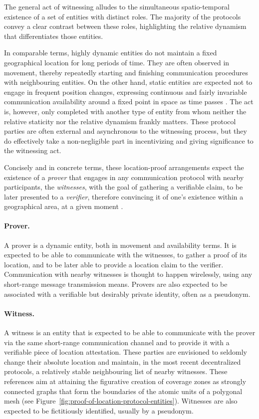 The general act of witnessing alludes to the simultaneous spatio-temporal existence of a set of entities with distinct roles. The majority of the protocols convey a clear contrast between these roles, highlighting the relative dynamism that differentiates those entities. 

In comparable terms, highly dynamic entities do not maintain a fixed geographical location for long periods of time. They are often observed in movement, thereby repeatedly starting and finishing communication procedures with neighbouring entities. On the other hand, static entities are expected not to engage in frequent position changes, expressing continuous and fairly invariable communication availability around a fixed point in space as time passes \cite{nasrulin2018robust}. The act is, however, only completed with another type of entity from whom neither the relative staticity nor the relative dynamism frankly matters. These protocol parties are often external and asynchronous to the witnessing process, but they do effectively take a non-negligible part in incentivizing and giving significance to the witnessing act. 

Concisely and in concrete terms, these location-proof arrangements expect the existence of a \emph{prover} that engages in any communication protocol with nearby participants, the \emph{witnesses}, with the goal of gathering a verifiable \pol{} claim, to be later presented to a \emph{verifier}, therefore convincing it of one's existence within a geographical area, at a given moment \cite{dupin2018location}.

\paragraph{Prover.} A prover is a dynamic entity, both in movement and availability terms. It is expected to be able to communicate with the witnesses, to gather a proof of its location, and to be later able to provide a location claim to the verifier. Communication with nearby witnesses is thought to happen wirelessly, using any short-range message transmission means. Provers are also expected to be associated with a verifiable but desirably private identity, often as a pseudonym.

\paragraph{Witness.} A witness is an entity that is expected to be able to communicate with the prover via the same short-range communication channel and to provide it with a verifiable piece of location attestation. These parties are envisioned to seldomly change their absolute location and maintain, in the most recent decentralized protocols, a relatively stable neighbouring list of nearby witnesses. These references aim at attaining the figurative creation of coverage zones as strongly connected graphs that form the boundaries of the atomic units of a polygonal mesh (see Figure~\ref{fig:proof-of-location-protocol-entities}). Witnesses are also expected to be fictitiously identified, usually by a pseudonym.

